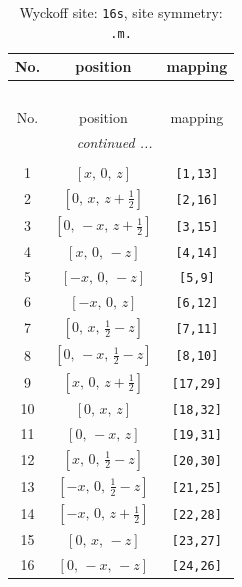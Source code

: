 \documentclass[fleqn,8pt]{jsarticle}
\begin{document}
\renewcommand{\arraystretch}{1.2}
\begin{longtable}{ccc}
\caption{Wyckoff site: {\tt 16s}, site symmetry: {\tt .m.}}
 \\
 \hline \hline
No. & position & mapping \\ \hline \endfirsthead

\multicolumn{2}{l}{\tablename\ \thetable{}} \\
 \hline \hline
No. & position & mapping \\ \hline \endhead

 \hline \hline
\multicolumn{2}{r}{\footnotesize\it continued ...} \\ \endfoot

 \hline \hline
\multicolumn{2}{r}{} \\ \endlastfoot

1 & $\left[ x,\, 0,\, z \right]$ & {\tt [1,13]} \\ \hline
2 & $\left[ 0,\, x,\, z + \frac{1}{2} \right]$ & {\tt [2,16]} \\ \hline
3 & $\left[ 0,\, - x,\, z + \frac{1}{2} \right]$ & {\tt [3,15]} \\ \hline
4 & $\left[ x,\, 0,\, - z \right]$ & {\tt [4,14]} \\ \hline
5 & $\left[ - x,\, 0,\, - z \right]$ & {\tt [5,9]} \\ \hline
6 & $\left[ - x,\, 0,\, z \right]$ & {\tt [6,12]} \\ \hline
7 & $\left[ 0,\, x,\, \frac{1}{2} - z \right]$ & {\tt [7,11]} \\ \hline
8 & $\left[ 0,\, - x,\, \frac{1}{2} - z \right]$ & {\tt [8,10]} \\ \hline
9 & $\left[ x,\, 0,\, z + \frac{1}{2} \right]$ & {\tt [17,29]} \\ \hline
10 & $\left[ 0,\, x,\, z \right]$ & {\tt [18,32]} \\ \hline
11 & $\left[ 0,\, - x,\, z \right]$ & {\tt [19,31]} \\ \hline
12 & $\left[ x,\, 0,\, \frac{1}{2} - z \right]$ & {\tt [20,30]} \\ \hline
13 & $\left[ - x,\, 0,\, \frac{1}{2} - z \right]$ & {\tt [21,25]} \\ \hline
14 & $\left[ - x,\, 0,\, z + \frac{1}{2} \right]$ & {\tt [22,28]} \\ \hline
15 & $\left[ 0,\, x,\, - z \right]$ & {\tt [23,27]} \\ \hline
16 & $\left[ 0,\, - x,\, - z \right]$ & {\tt [24,26]} \\
\end{longtable}
\end{document}
